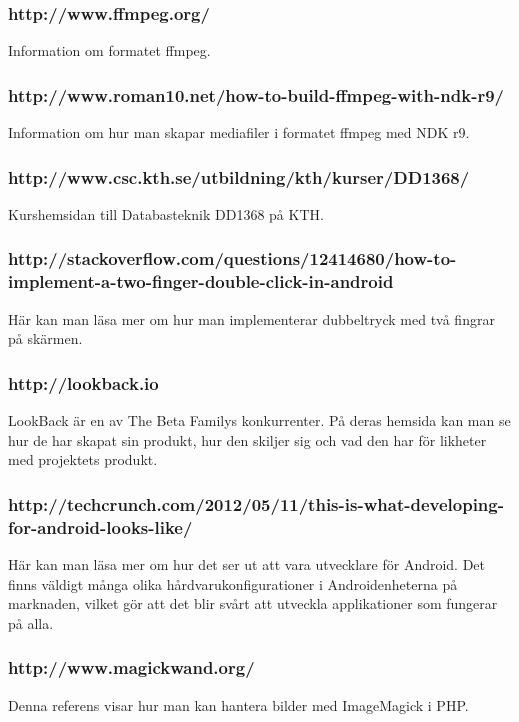 \subsubsection{http://www.ffmpeg.org/}
Information om formatet ffmpeg.

\subsubsection{http://www.roman10.net/how-to-build-ffmpeg-with-ndk-r9/}
Information om hur man skapar mediafiler i formatet ffmpeg med NDK r9.

\subsubsection{http://www.csc.kth.se/utbildning/kth/kurser/DD1368/}
Kurshemsidan till Databasteknik DD1368 på KTH.

\subsubsection{http://stackoverflow.com/questions/12414680/how-to-implement-a-two-finger-double-click-in-android}
Här kan man läsa mer om hur man implementerar dubbeltryck med två fingrar på skärmen.

\subsubsection{http://lookback.io}
LookBack är en av The Beta Familys konkurrenter. På deras hemsida kan man se hur de har skapat sin produkt, hur den skiljer sig och vad den har för likheter med projektets produkt.

\subsubsection{http://techcrunch.com/2012/05/11/this-is-what-developing-for-android-looks-like/}
Här kan man läsa mer om hur det ser ut att vara utvecklare för Android. Det finns väldigt många olika hårdvarukonfigurationer i Androidenheterna på marknaden, vilket gör att det blir svårt att utveckla applikationer som fungerar på alla.

\subsubsection{http://www.magickwand.org/}
Denna referens visar hur man kan hantera bilder med ImageMagick i PHP.
